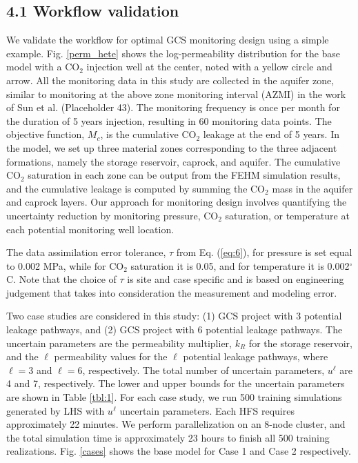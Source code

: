 \documentclass[10pt, twoside]{article}
\begin{document}
\subsection*{4.1 Workflow validation}
We validate the workflow for optimal GCS monitoring design using a simple example. Fig. \ref{perm_hete} shows the log-permeability distribution for the base model with a CO$_2$ injection well at the center, noted with a yellow circle and arrow. All the monitoring data in this study are collected in the aquifer zone, similar to monitoring at the above zone monitoring interval (AZMI) in the work of Sun et al. (Placeholder 43). The monitoring frequency is once per month for the duration of 5 years injection, resulting in 60 monitoring data points. The objective function, $M_c$, is the cumulative CO$_2$ leakage at the end of 5 years. In the model, we set up three material zones corresponding to the three adjacent formations, namely the storage reservoir, caprock, and aquifer. The cumulative CO$_2$ saturation in each zone can be output from the FEHM simulation results, and the cumulative leakage is computed by summing the CO$_2$ mass in the aquifer and caprock layers. Our approach for monitoring design involves quantifying the uncertainty reduction by monitoring pressure, CO$_2$ saturation, or temperature at each potential monitoring well location. 

The data assimilation error tolerance, $\tau$ from Eq. (\ref{eq:6}), for pressure is set equal to 0.002 MPa, while for CO$_2$ saturation it is 0.05, and for temperature it is 0.002$^\circ$C. Note that the choice of $\tau$ is site and case specific and is based on engineering judgement that takes into consideration the measurement and modeling error.

Two case studies are considered in this study: (1) GCS project with 3 potential leakage pathways, and (2) GCS project with 6 potential leakage pathways. The uncertain parameters are the permeability multiplier, $k_R$ for the storage reservoir, and the $\ell$ permeability values for the $\ell$ potential leakage pathways, where $\ell=3$ and $\ell=6$, respectively. The total number of uncertain parameters, $u^\ell$ are 4 and 7, respectively. The lower and upper bounds for the uncertain parameters are shown in Table \ref{tbl:1}. For each case study, we run 500 training simulations generated by LHS with $u^\ell$ uncertain parameters. Each HFS requires approximately 22 minutes. We perform parallelization on an 8-node cluster, and the total simulation time is approximately 23 hours to finish all 500 training realizations. Fig. \ref{cases} shows the base model for Case 1 and Case 2 respectively.
\end{document}
